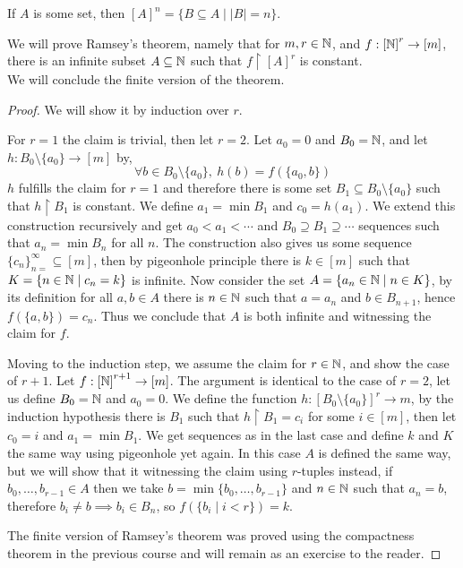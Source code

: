 \question{}
\begin{remark}
	If $A$ is some set, then ${[A]}^n = \{ B \subseteq A \mid |B| = n \}$.
\end{remark}
We will prove Ramsey's theorem,
namely that for $m, r \in \mathbb{N}$, and $f : {[ \mathbb{N} ]}^r \to [m]$, there is an infinite subset $A \subseteq \mathbb{N}$ such that $f \restriction {[ A ]}^r$ is constant. \\
We will conclude the finite version of the theorem.
\begin{proof}
	We will show it by induction over $r$.

	For $r = 1$ the claim is trivial, then let $r = 2$.
	Let $a_0 = 0$ and $B_0 = \mathbb{N}$, and let $h : B_0 \setminus \{ a_0 \} \to [m]$ by,
	\[
		\forall b \in B_0 \setminus \{ a_0 \},\ h(b) = f(\{a_0, b\})
	\]
	$h$ fulfills the claim for $r = 1$ and therefore there is some set $B_1 \subseteq B_0 \setminus \{ a_0 \}$ such that $h \restriction B_1$ is constant.
	We define $a_1 = \min B_1$ and $c_0 = h(a_1)$.
	We extend this construction recursively and get $a_0 < a_1 < \cdots$ and $B_0 \supseteq B_1 \supseteq \cdots$ sequences such that $a_n = \min B_n$ for all $n$.
	The construction also gives us some sequence ${\{ c_n \}}_{n = }^\infty \subseteq [m]$, then by pigeonhole principle there is $k \in [m]$ such that $K = \{ n \in \mathbb{N} \mid c_n = k \}$ is infinite.
	Now consider the set $A = \{ a_n \in \mathbb{N} \mid n \in K \}$, by its definition for all $a, b \in A$ there is $n \in \mathbb{N}$ such that $a = a_n$ and $b \in B_{n + 1}$, hence $f(\{a, b\}) = c_n$.
	Thus we conclude that $A$ is both infinite and witnessing the claim for $f$.

	Moving to the induction step, we assume the claim for $r \in \mathbb{N}$, and show the case of $r + 1$.
	Let $f : {[ \mathbb{N} ]}^{r + 1} \to [m]$.
	The argument is identical to the case of $r = 2$, let us define $B_0 = \mathbb{N}$ and $a_0 = 0$.
	We define the function $h : {[ B_0 \setminus \{ a_0 \} ]}^r \to m$, by the induction hypothesis there is $B_1$ such that $h \restriction B_1 = c_i$ for some $i \in [m]$, then let $c_0 = i$ and $a_1 = \min B_1$.
	We get sequences as in the last case and define $k$ and $K$ the same way using pigeonhole yet again.
	In this case $A$ is defined the same way, but we will show that it witnessing the claim using $r$-tuples instead,
	if $b_0, \ldots, b_{r - 1} \in A$ then we take $b = \min\{ b_0, \ldots, b_{r - 1} \}$ and $n \in \mathbb{N}$ such that $a_n = b$, therefore $b_i \ne b \implies b_i \in B_n$, so $f(\{ b_i \mid i < r \}) = k$.

	The finite version of Ramsey's theorem was proved using the compactness theorem in the previous course and will remain as an exercise to the reader.
\end{proof}

